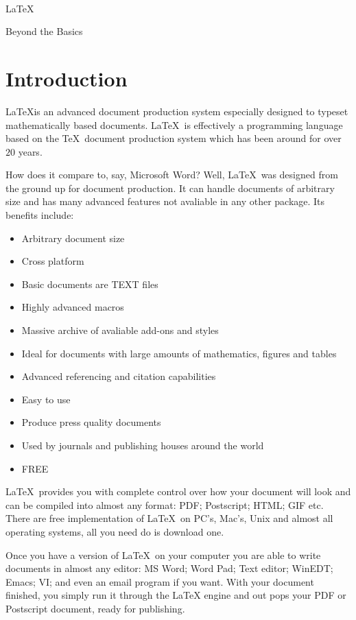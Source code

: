 \documentclass[12pt, a4paper]{book}
\begin{document}
\begin{titlepage}
\centering
\mbox{\ }
\vspace{5cm}

{\Huge \LaTeX}

\vspace{1cm}

{\huge Beyond the Basics}
\end{titlepage}

\section*{Introduction}
\LaTeX is an advanced document production system especially designed to typeset mathematically based documents.  \LaTeX\ is effectively a programming language based on the \TeX\ document production system which has been around for over $20$ years.

How does it compare to, say, Microsoft Word?  Well, \LaTeX\ was designed from the ground up for document production.  It can handle documents of arbitrary size and has many advanced features not avaliable in any other package.  Its benefits include:
\begin{itemize}
\item Arbitrary document size
\item Cross platform
\item Basic documents are TEXT files
\item Highly advanced macros
\item Massive archive of avaliable add-ons and styles
\item Ideal for documents with large amounts of mathematics, figures and tables
\item Advanced referencing and citation capabilities
\item Easy to use
\item Produce press quality documents
\item Used by journals and publishing houses around the world
\item FREE
\end{itemize}

\LaTeX\ provides you with complete control over how your document will look and can be compiled into almost any format: PDF; Postscript; HTML; GIF etc.  There are free implementation of \LaTeX\ on PC's, Mac's, Unix and almost all operating systems, all you need do is download one.

Once you have a version of \LaTeX\ on your computer you are able to write documents in almost any editor: MS Word; Word Pad; Text editor; WinEDT; Emacs; VI; and even an email program if you want.  With your document finished, you simply run it through the LaTeX engine and out pops your PDF or Postscript document, ready for publishing.
\end{document}
